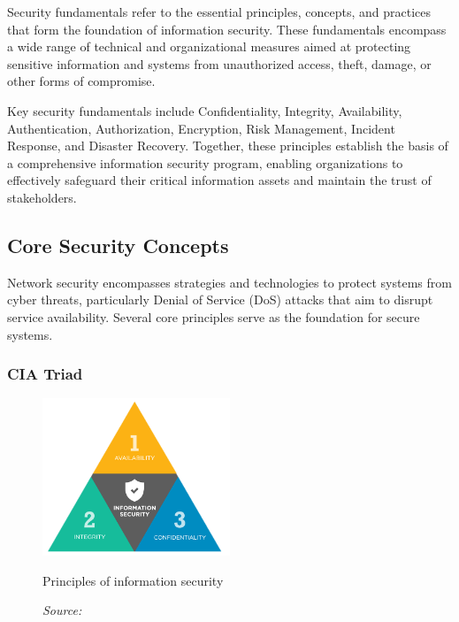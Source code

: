 \documentclass{report}
\begin{document}
Security fundamentals refer to the essential principles, concepts, and practices that form the foundation of information security. These fundamentals encompass a wide range of technical and organizational measures aimed at protecting sensitive information and systems from unauthorized access, theft, damage, or other forms of compromise.

Key security fundamentals include Confidentiality, Integrity, Availability, Authentication, Authorization, Encryption, Risk Management, Incident Response, and Disaster Recovery. Together, these principles establish the basis of a comprehensive information security program, enabling organizations to effectively safeguard their critical information assets and maintain the trust of stakeholders.\cite{ibm_security_fundamental}


\subsection{Core Security Concepts}

Network security encompasses strategies and technologies to protect systems from cyber threats, particularly Denial of Service (DoS) attacks that aim to disrupt service availability. Several core principles serve as the foundation for secure systems.

\subsubsection{CIA Triad}


\begin{figure}[ht]
    \centering
    \includegraphics[width=0.5\textwidth]{images/CIA-graph.png}
    \caption{Principles of information security}
    \caption*{\footnotesize\textit{Source: \cite{ibm_principles_of_information_security}}}
    \label{fig:cia-graph}
\end{figure}
\end{document}
